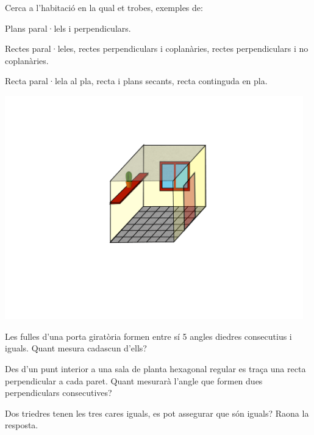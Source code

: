 \begin{mylist}
	
\vspace{-2.5cm}
\exer \begin{minipage}[t]{0.6\textwidth}
Cerca a l'habitació en la qual et trobes, exemples de:
	
	\begin{tasks}
		\task  Plans paral·lels i perpendiculars. 
		
		\task  Rectes paral·leles, rectes perpendiculars i coplanàries, rectes perpendiculars i no coplanàries.
		
		\task  Recta paral·lela al pla, recta i plans secants, recta continguda en pla.
	\end{tasks}

\end{minipage}
\begin{minipage}{0.3\textwidth}
	\centering
	\vspace{2.5cm}
	\includegraphics[width=0.97\textwidth]{img-11/habitacio}
\end{minipage}



\exer  Les fulles d'una porta giratòria formen entre sí 5 angles diedres consecutius i iguals. Quant mesura cadascun d'ells?

\exer  Des d'un punt interior a una sala de planta hexagonal regular es traça una recta perpendicular a cada paret. Quant mesurarà l'angle que formen dues perpendiculars consecutives?

\exer  Dos triedres tenen les tres cares iguals, es pot assegurar que són iguals? Raona la resposta.

\end{mylist}
 
